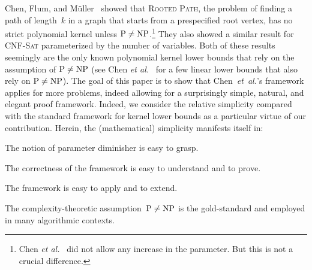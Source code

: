 \documentclass[11pt,a4,USenglish]{article}
\newcommand{\prob}[1]{\textsc{#1}}
\newcommand{\NP}{\textnormal{NP}}
\newcommand{\PTIME}{\textnormal{P}}
\newcommand{\PnotNP}{$\PTIME{}\neq\NP{}$}
\theoremstyle{definition}
\theoremstyle{plain}
\theoremstyle{remark}
\begin{document}
Chen, Flum, and M\"{u}ller~\cite{chen2011lower} showed that \prob{Rooted Path}, the problem of finding a path of length~$k$ in a graph that starts from a prespecified root vertex, has no strict polynomial kernel unless \PnotNP{}.\footnote{Chen \emph{et al.}~\cite{chen2011lower} did not allow any increase in the parameter. But this is not a crucial difference.} 
They also showed a similar result for \prob{CNF-Sat} parameterized by the number of variables. 
Both of these results seemingly are the only known polynomial kernel lower bounds that rely on the assumption of \PnotNP{} (see Chen \emph{et al.}~\cite{CFKX07} for a few linear lower bounds that also rely on \PnotNP{}). 
%
%
The goal of this paper is to show that Chen~\emph{et~al.}'s framework applies for more problems, indeed allowing for a surprisingly simple, natural, and elegant proof framework. 
Indeed, we consider the relative simplicity compared with the standard framework for kernel lower bounds as a particular virtue of our contribution.
Herein, the (mathematical) simplicity manifests itself in:
\begin{compactitem}
%
 \item The notion of parameter diminisher is easy to grasp.
 \item The correctness of the framework is easy to understand and to prove.
 \item The framework is easy to apply and to extend.
 \item The complexity-theoretic assumption~\PnotNP{} is the gold-standard and employed in many algorithmic contexts.
\end{compactitem}

%
\end{document}
